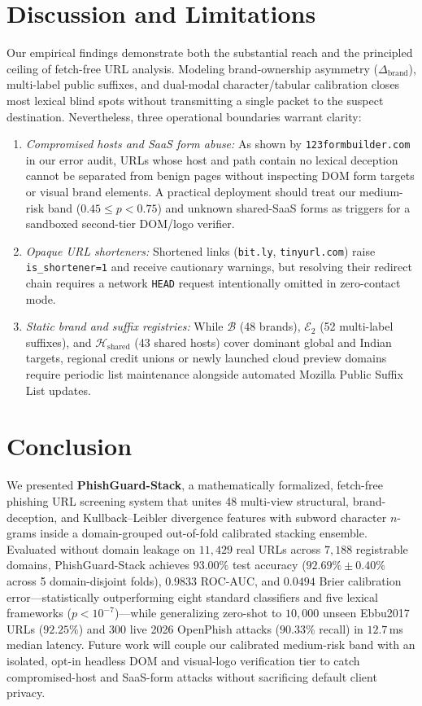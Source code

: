 \documentclass[conference]{IEEEtran}
\begin{document}
\section{Discussion and Limitations}
\label{sec:disc}
Our empirical findings demonstrate both the substantial reach and the principled ceiling of fetch-free URL analysis. Modeling brand-ownership asymmetry ($\Delta_{\text{brand}}$), multi-label public suffixes, and dual-modal character/tabular calibration closes most lexical blind spots without transmitting a single packet to the suspect destination. Nevertheless, three operational boundaries warrant clarity:
\begin{enumerate}
\item \textit{Compromised hosts and SaaS form abuse:} As shown by \texttt{123formbuilder.com} in our error audit, URLs whose host and path contain no lexical deception cannot be separated from benign pages without inspecting DOM form targets or visual brand elements. A practical deployment should treat our medium-risk band ($0.45 \le p < 0.75$) and unknown shared-SaaS forms as triggers for a sandboxed second-tier DOM/logo verifier.
\item \textit{Opaque URL shorteners:} Shortened links (\texttt{bit.ly}, \texttt{tinyurl.com}) raise \texttt{is\_shortener=1} and receive cautionary warnings, but resolving their redirect chain requires a network \texttt{HEAD} request intentionally omitted in zero-contact mode.
\item \textit{Static brand and suffix registries:} While $\mathcal{B}$ (48 brands), $\mathcal{E}_2$ (52 multi-label suffixes), and $\mathcal{H}_{\text{shared}}$ (43 shared hosts) cover dominant global and Indian targets, regional credit unions or newly launched cloud preview domains require periodic list maintenance alongside automated Mozilla Public Suffix List updates.
\end{enumerate}

\section{Conclusion}
We presented \textbf{PhishGuard-Stack}, a mathematically formalized, fetch-free phishing URL screening system that unites 48 multi-view structural, brand-deception, and Kullback--Leibler divergence features with subword character $n$-grams inside a domain-grouped out-of-fold calibrated stacking ensemble. Evaluated without domain leakage on $11{,}429$ real URLs across $7{,}188$ registrable domains, PhishGuard-Stack achieves $93.00\%$ test accuracy ($92.69\% \pm 0.40\%$ across 5 domain-disjoint folds), $0.9833$ ROC-AUC, and $0.0494$ Brier calibration error---statistically outperforming eight standard classifiers and five lexical frameworks ($p < 10^{-7}$)---while generalizing zero-shot to $10{,}000$ unseen Ebbu2017 URLs ($92.25\%$) and $300$ live 2026 OpenPhish attacks ($90.33\%$ recall) in $12.7$\,ms median latency. Future work will couple our calibrated medium-risk band with an isolated, opt-in headless DOM and visual-logo verification tier to catch compromised-host and SaaS-form attacks without sacrificing default client privacy.
\end{document}
